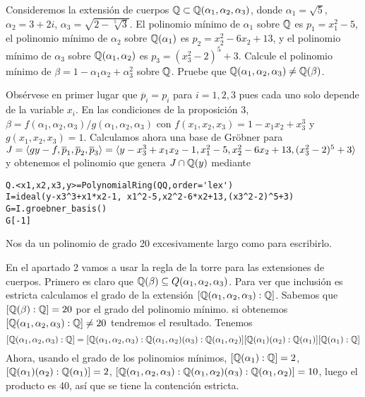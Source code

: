 \documentclass[twoside]{article}
\begin{document}
\begin{ejercicio}{3}
Consideremos la extensión de cuerpos $\mathbb{Q}\subset \mathbb{Q}(\alpha_1,\alpha_2,\alpha_3)$, donde $\alpha_1=\sqrt{5}$, $\alpha_2=3+2i$, $\alpha_3=\sqrt{2-\sqrt[5]{3}}$. El polinomio mínimo de $\alpha_1$ sobre $\mathbb{Q}$ es $p_1=x_1^2-5$, el polinomio mínimo de $\alpha_2$ sobre $\mathbb{Q}(\alpha_1)$ es $p_2=x_2^2-6x_2+13$, y el polinomio mínimo de $\alpha_3$ sobre $\mathbb{Q}(\alpha_1,\alpha_2)$ es $p_3=(x_3^2-2)^5+3$. Calcule el polinomio mínimo de $\beta=1-\alpha_1\alpha_2+\alpha_3^2$ sobre $\mathbb{Q}$. Pruebe que $\mathbb{Q}(\alpha_1,\alpha_2,\alpha_3)\neq\mathbb{Q}(\beta)$. 
\end{ejercicio}
\begin{solucion}
Obsérvese en primer lugar que $\overline{p}_i=p_i$ para $i=1,2,3$ pues cada uno solo depende de la variable $x_i$. En las condiciones de la proposición 3, $\beta=f(\alpha_1,\alpha_2,\alpha_3)/g(\alpha_1,\alpha_2,\alpha_3)$ con $f(x_1,x_2,x_3)=1-x_1x_2+x_3^3$ y $g(x_1,x_2,x_3)=1$. Calculamos ahora una base de Gröbner para $J=\langle{gy-f, \overline{p}_1,\overline{p}_2,\overline{p}_3}\rangle=\langle{y-x_3^3+x_1x_2-1, x_1^2-5,x_2^2-6x_2+13,(x_3^2-2)^5+3}\rangle$ y obtenemos el polinomio que genera $J\cap \mathbb{Q}(y)$ mediante
\begin{verbatim}
Q.<x1,x2,x3,y>=PolynomialRing(QQ,order='lex')
I=ideal(y-x3^3+x1*x2-1, x1^2-5,x2^2-6*x2+13,(x3^2-2)^5+3)
G=I.groebner_basis()
G[-1]
\end{verbatim}
Nos da un polinomio de grado 20 excesivamente largo como para escribirlo. 

En el apartado 2 vamos a usar la regla de la torre para las extensiones de cuerpos. Primero es claro que $\mathbb{Q}(\beta)\subseteq Q(\alpha_1,\alpha_2,\alpha_3)$. Para ver que inclusión es estricta calculamos el grado de la extensión $[\mathbb{Q}(\alpha_1,\alpha_2,\alpha_3):\mathbb{Q}]$. Sabemos que $[\mathbb{Q}(\beta):\mathbb{Q}]=20$ por el grado del polinomio mínimo. si obtenemos $[\mathbb{Q}(\alpha_1,\alpha_2,\alpha_3):\mathbb{Q}]\neq 20$ tendremos el resultado. Tenemos
\[
[\mathbb{Q}(\alpha_1,\alpha_2,\alpha_3):\mathbb{Q}]=[\mathbb{Q}(\alpha_1,\alpha_2,\alpha_3):\mathbb{Q}(\alpha_1,\alpha_2)(\alpha_3):\mathbb{Q}(\alpha_1,\alpha_2)][\mathbb{Q}(\alpha_1)(\alpha_2):\mathbb{Q}(\alpha_1)][\mathbb{Q}(\alpha_1):\mathbb{Q}]
\]
Ahora, usando el grado de los polinomios mínimos,  $[\mathbb{Q}(\alpha_1):\mathbb{Q}]=2$, $[\mathbb{Q}(\alpha_1)(\alpha_2):\mathbb{Q}(\alpha_1)]=2$, $[\mathbb{Q}(\alpha_1,\alpha_2,\alpha_3):\mathbb{Q}(\alpha_1,\alpha_2)(\alpha_3):\mathbb{Q}(\alpha_1,\alpha_2)]=10$, luego el producto es 40, así que se tiene la contención estricta. 
\end{solucion}
\end{document}
